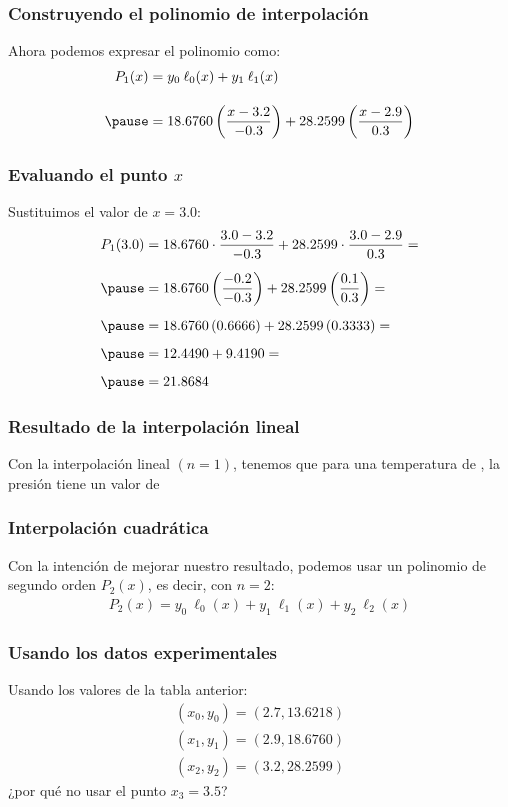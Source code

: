 \documentclass[12pt]{beamer}
\begin{document}
\begin{frame}
\frametitle{Construyendo el polinomio de interpolación}
Ahora podemos expresar el polinomio como:
\pause
\begin{eqnarray*}
\begin{aligned}
P_{1} (x) &= y_{0} \: \ell_{0} (x) + y_{1} \: \ell_{1} (x) \\[1em] \pause
&= 18.6760 \left( \dfrac{x - 3.2}{-0.3} \right) + 28.2599 \left( \dfrac{x - 2.9}{0.3} \right)
\end{aligned}
\end{eqnarray*}
\end{frame}
\begin{frame}
\frametitle{Evaluando el punto $x$}
Sustituimos el valor de $x = 3.0$:
\pause
\begin{eqnarray*}
\begin{aligned}
P_{1} (3.0) &= 18.6760 \cdot \dfrac{3.0 - 3.2}{-0.3} + 28.2599 \cdot \dfrac{3.0 - 2.9}{0.3} = \\[0.5em] \pause
&= 18.6760 \left( \dfrac{-0.2}{-0.3} \right) + 28.2599 \left( \dfrac{0.1}{0.3} \right) = \\[0.5em] \pause
&= 18.6760 \left( 0.6666 \right)  + 28.2599 \left( 0.3333 \right) = \\[0.5em] \pause
&= 12.4490 + 9.4190 = \\[0.5em] \pause
&= 21.8684
\end{aligned}
\end{eqnarray*}
\end{frame}
\begin{frame}
\frametitle{Resultado de la interpolación lineal}
Con la interpolación lineal $(n = 1)$, tenemos que para una temperatura de , \pause la presión tiene un valor de 
\end{frame}
\begin{frame}
\frametitle{Interpolación cuadrática}
Con la intención de mejorar nuestro resultado, podemos usar un polinomio de segundo orden $P_{2} (x)$, es decir, con $n = 2$:
\pause
\begin{align*}
P_{2} (x) = y_{0} \: \ell_{0} (x) + y_{1} \: \ell_{1} (x) + y_{2} \: \ell_{2} (x)
\end{align*}
\end{frame}
\begin{frame}
\frametitle{Usando los datos experimentales}
Usando los valores de la tabla anterior:
\pause
\begin{eqnarray*}
(x_{0}, y_{0}) = (2.7, 13.6218) \\
(x_{1}, y_{1}) = (2.9, 18.6760) \\
(x_{2}, y_{2}) = (3.2, 28.2599)
\end{eqnarray*}
\pause
¿por qué no usar el punto $x_{3} = 3.5$?
\end{frame}
\end{document}
